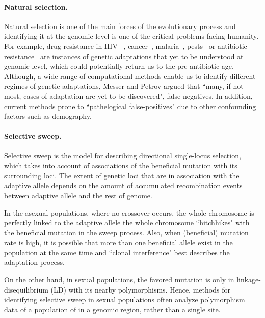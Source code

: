 \documentclass[11pt]{article}
\begin{document}
\paragraph{Natural selection.} Natural selection is one of the main forces of 
the evolutionary 
process and 
identifying it at the genomic level is one of the critical problems facing 
humanity.
For example, drug resistance in HIV ~\cite{Feder2016More}, 
cancer~\cite{gottesman2002mechanisms,zahreddine2013mechanisms},
malaria~\cite{ariey2014molecular,nair2007recurrent},
pests~\cite{daborn2001ddt} or antibiotic 
resistance~\cite{spellberg2008epidemic} are instances of genetic adaptations 
that yet to be 
understood at genomic level, which could potentially return us to the 
pre-antibiotic age.
Although, a wide range of computational methods \cite{vitti2013detecting} 
enable us to identify different regimes of genetic adaptations, Messer 
and Petrov 
\cite{messer2013population} argued that ``many, if not most, cases of 
adaptation are yet to be discovered", false-negatives. In addition, current 
methods prone to ``pathelogical false-positives" due to other confounding 
factors such as demography.


\paragraph{Selective sweep.} Selective sweep 
\cite{smith1974hitch,kaplan1989hitchhiking} is the 
model for describing directional single-locus selection, which takes into 
account of associations of the beneficial mutation with its surrounding loci.
The extent of genetic loci that are in association with the adaptive allele 
depends on the amount of accumulated recombination events between adaptive 
allele and the rest of genome. 

In the asexual populations, where no 
crossover occurs, the whole chromosome is perfectly linked to the 
adaptive allele the whole chromosome ``hitchhikes" with the beneficial mutation in 
the sweep process.
Also, when (beneficial) mutation rate is high, it is possible that more than 
one beneficial allele exist in the population at the same time and ``clonal 
interference" \cite{desai2007beneficial,lang2013pervasive} 
best describes the adaptation process.

On the other hand, in sexual populations, the favored mutation is only in 
linkage-disequilibrium (LD) with its nearby polymorphisms. Hence, methods for 
identifying selective 
sweep in sexual populations often analyze  polymorphism data of a population of 
in a genomic region, rather than a single site. 
\end{document}
